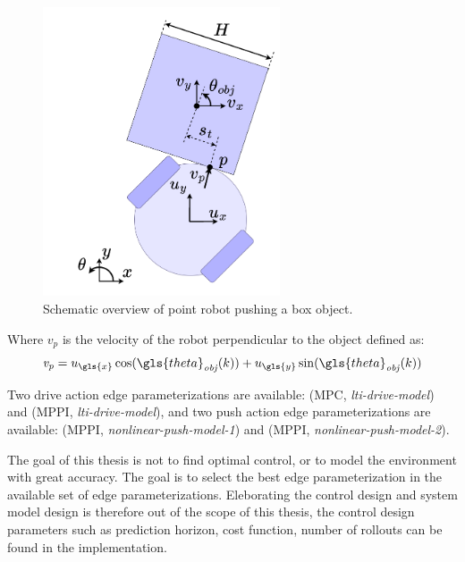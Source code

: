 \begin{figure}[H]
    \centering
    \includegraphics[width=7cm]{figures/results/robot_and_square_object.drawio}
    \caption{Schematic overview of point robot pushing a box object.}%
    \label{fig:robot_and_square_object}
\end{figure}

Where $v_p$ is the velocity of the robot perpendicular to the object defined as:\bs
\[ \mathit{v_p} = u_{\gls{x}} \cos(\gls{theta}_{\mathit{obj}}(k)) + u_{\gls{y}}\sin(\gls{theta}_{\mathit{obj}}(k)) \]

Two drive action edge parameterizations are available: (\ac{MPC}, \textit{lti-drive-model}) and (\ac{MPPI}, \textit{lti-drive-model}), and two push action edge parameterizations are available: (\ac{MPPI}, \textit{nonlinear-push-model-1}) and (\ac{MPPI}, \textit{nonlinear-push-model-2}).\bs

The goal of this thesis is not to find optimal control, or to model the environment with great accuracy. The goal is to select the best edge parameterization in the available set of edge parameterizations. Eleborating the control design and system model design is therefore out of the scope of this thesis, the control design parameters such as prediction horizon, cost function, number of rollouts can be found in the implementation.\bs

